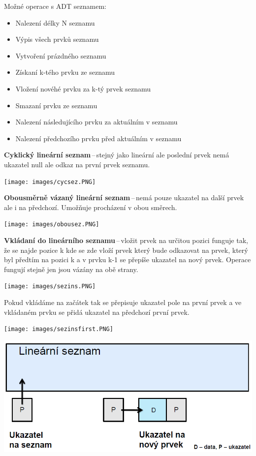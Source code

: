 Možné operace s ADT seznamem:
\begin{itemize}
    \item Nalezení délky N seznamu
    \item Výpis všech prvků seznamu
    \item Vytvoření prázdného seznamu
    \item Získaní k-tého prvku ze seznamu
    \item Vložení novéhé prvku za k-tý prvek seznamu
    \item Smazaní prvku ze seznamu
    \item Nalezení následujícího prvku za aktuálním v seznamu
    \item Nalezení předchozího prvku před aktuálním v seznamu
\end{itemize}

\textbf{Cyklický lineární seznam}\,--\,stejný jako lineární ale poslední prvek nemá ukazatel null ale odkaz na první prvek seznamu.

\begin{center}
\texttt{[image: images/cycsez.PNG]}
\end{center}

\textbf{Obousměrně vázaný lineární seznam}\,--\,nemá pouze ukazatel na další prvek ale i na předchozí. Umožňuje procházení v obou směrech.

\begin{center}
\texttt{[image: images/obousez.PNG]}
\end{center}

\textbf{Vkládaní do lineárního seznamu}\,--\,vložit prvek na určitou pozici funguje tak, že se najde pozice k kde se zde vloží prvek který bude odkazovat na prvek, který byl předtím na pozici k a v prvku k-1 se přepíše ukazatel na nový prvek. Operace fungují stejně jen jsou vázány na obě strany.

\begin{center}
    
\texttt{[image: images/sezins.PNG]}
\end{center}

Pokud vkládáme na začátek tak se přepisuje ukazatel pole na první prvek a ve vkládaném prvku se přidá ukazatel na předchozí první prvek.

\begin{center}
\texttt{[image: images/sezinsfirst.PNG]}

\vspace{1cm}
\includegraphics[scale=0.5]{images/sezinsempty.PNG}
\end{center}

